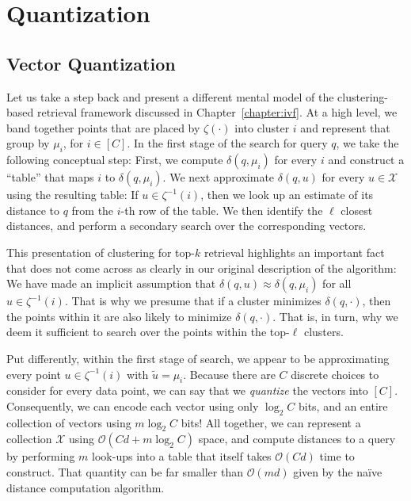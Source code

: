 \chapter{Quantization}
\label{chapter:quantization}


\section{Vector Quantization}

Let us take a step back and present a different mental model of the clustering-based retrieval framework
discussed in Chapter~\ref{chapter:ivf}.
At a high level, we band together points that are placed by $\zeta(\cdot)$ into cluster $i$
and represent that group by $\mu_i$, for $i \in [C]$. In the first stage of the search for query $q$,
we take the following conceptual step:
First, we compute $\delta(q, \mu_i)$ for every $i$ and construct a ``table''
that maps $i$ to $\delta(q, \mu_i)$. We next approximate $\delta(q, u)$ for every $u \in \mathcal{X}$
using the resulting table: If $u \in \zeta^{-1}(i)$, then we look up an estimate of
its distance to $q$ from the $i$-th row of the table.
We then identify the $\ell$ closest distances, and perform a secondary search over
the corresponding vectors.

This presentation of clustering for top-$k$ retrieval highlights an important fact that does
not come across as clearly in our original description of the algorithm:
We have made an implicit assumption that $\delta(q, u) \approx \delta(q, \mu_i)$
for all $u \in \zeta^{-1}(i)$.
That is why we presume that if a cluster minimizes $\delta(q, \cdot)$, then the points within it
are also likely to minimize $\delta(q, \cdot)$.
That is, in turn, why we deem it sufficient to search over the points within the top-$\ell$ clusters.

Put differently, within the first stage of search, we appear to be approximating every point
$u \in \zeta^{-1}(i)$ with $\tilde{u} = \mu_i$. Because there are $C$ discrete choices to consider
for every data point, we can say that we \emph{quantize} the vectors into $[C]$.
Consequently, we can encode each vector using only
$\log_2 C$ bits, and an entire collection of vectors using $m \log_2 C$ bits!
All together, we can represent a collection $\mathcal{X}$ using $\mathcal{O}(Cd + m \log_2 C)$ space,
and compute distances to a query by performing $m$ look-ups into a table
that itself takes $\mathcal{O}(Cd)$ time to construct.
That quantity can be far smaller than $\mathcal{O}(md)$ given by the na\"ive distance computation
algorithm.

